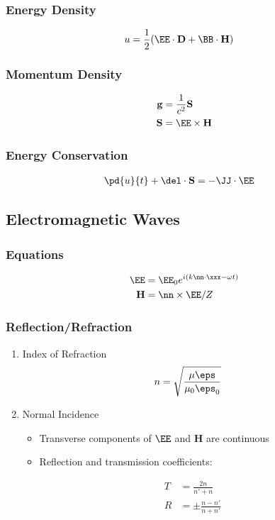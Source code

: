 \documentclass[11pt]{article}
\renewcommand{\HH}{\mathbf{H}}
\newcommand{\DD}{\mathbf{D}}
\renewcommand{\SS}{\mathbf{S}}
\begin{document}
\subsubsection{Energy Density}
\label{sec:orgf618143}
\begin{align*}
u & = \frac{1}{2} (\EE \cdot \DD + \BB \cdot \HH)
\end{align*}
\subsubsection{Momentum Density}
\label{sec:org14cc533}
\begin{align*}
\mathbf{g} & = \frac{1}{c^2} \SS \\
\SS & = \EE \times \HH
\end{align*}
\subsubsection{Energy Conservation}
\label{sec:org7d48afe}
\begin{align*}
\pd{u}{t} + \del \cdot \SS & = -\JJ \cdot \EE
\end{align*}
\subsection{Electromagnetic Waves}
\label{sec:org56f9cda}
\subsubsection{Equations}
\label{sec:org98e7cf2}
\begin{align*}
\EE & = \EE_0 e^{i(k \nn \cdot \xxx - \omega t)} \\
\HH & = \nn \times \EE / Z
\end{align*}
\subsubsection{Reflection/Refraction}
\label{sec:org189cdc0}
\begin{enumerate}
\item Index of Refraction
\label{sec:org5a69c09}
\begin{align*}
n & = \sqrt{\frac{\mu \eps}{\mu_0 \eps_0}}
\end{align*}
\item Normal Incidence
\label{sec:org8878996}
\begin{itemize}
\item Transverse components of \(\EE\) and \(\HH\) are continuous
\item Reflection and transmission coefficients:
\end{itemize}
\begin{align*}
T & = \frac{2n}{n' + n} \\
R & = \pm \frac{n-n'}{n+n'} \\
\end{align*}
\end{enumerate}
\end{document}
